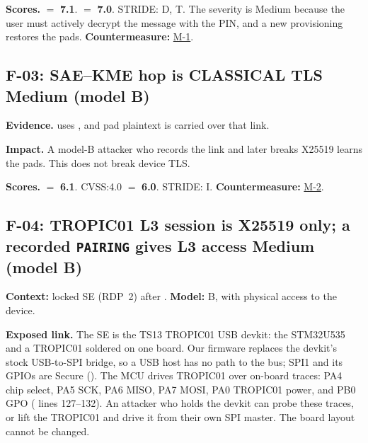 \documentclass[11pt,a4paper]{article}
\newcommand{\sev}[1]{\textbf{#1}}
\begin{document}
\textbf{Scores.}  $=$ \textbf{7.1}.  $=$ \textbf{7.0}. STRIDE: D, T. The severity is Medium because the user must actively decrypt the message with the PIN, and a new provisioning restores the pads. \textbf{Countermeasure:} \hyperref[m:M-1]{M-1}.

\subsection*{F-03: SAE--KME hop is CLASSICAL TLS \hfill \sev{Medium (model B)}}\label{f:F-03}
\textbf{Evidence.}  uses , and pad plaintext is carried over that link.

\textbf{Impact.} A model-B attacker who records the link and later breaks X25519 learns the pads. This does not break device  TLS.

\textbf{Scores.}  $=$ \textbf{6.1}. CVSS:4.0 $=$ \textbf{6.0}. STRIDE: I. \textbf{Countermeasure:} \hyperref[m:M-2]{M-2}.

\subsection*{F-04: TROPIC01 L3 session is X25519 only; a recorded \texttt{PAIRING} gives L3 access \hfill \sev{Medium (model B)}}\label{f:F-04}
\textbf{Context:} locked SE (RDP~2) after . \textbf{Model:} B, with physical access to the device.

\textbf{Exposed link.} The SE is the TS13 TROPIC01 USB devkit: the STM32U535 and a TROPIC01 soldered on one board. Our firmware replaces the devkit's stock USB-to-SPI bridge, so a USB host has no path to the bus; SPI1 and its GPIOs are Secure (). The MCU drives TROPIC01 over on-board traces: PA4 chip select, PA5 SCK, PA6 MISO, PA7 MOSI, PA0 TROPIC01 power, and PB0 GPO ( lines 127--132). An attacker who holds the devkit can probe these traces, or lift the TROPIC01 and drive it from their own SPI master. The board layout cannot be changed.
\end{document}
